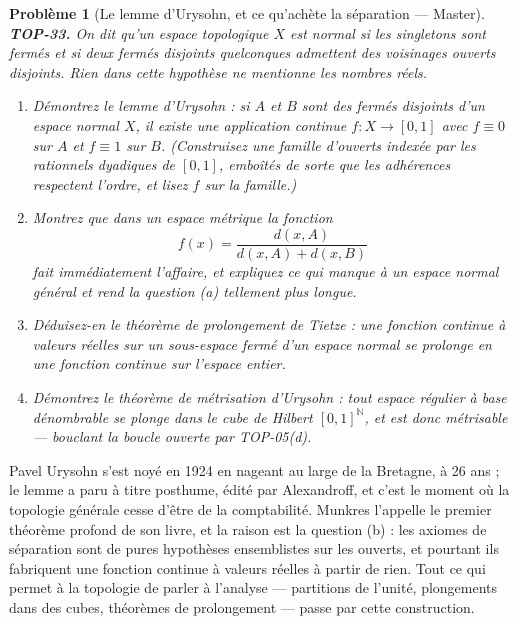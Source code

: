\documentclass[11pt]{article}
\newtheorem{problem}{Problème}
\begin{document}
\begin{problem}[{Le lemme d'Urysohn, et ce qu'achète la séparation --- Master}]
\textbf{TOP-33.} On dit qu'un espace topologique $ X $ est \textit{normal} si les singletons sont
fermés et si deux fermés disjoints quelconques admettent des voisinages ouverts disjoints. Rien dans
cette hypothèse ne mentionne les nombres réels.
\begin{enumerate}
\item[(a)] Démontrez le lemme d'Urysohn : si $ A $ et $ B $ sont des fermés disjoints d'un espace normal
$ X $, il existe une application continue $ f : X \to [0,1] $ avec $ f \equiv 0 $ sur $ A $ et
$ f \equiv 1 $ sur $ B $. (Construisez une famille d'ouverts indexée par les rationnels dyadiques de
$ [0,1] $, emboîtés de sorte que les adhérences respectent l'ordre, et lisez $ f $ sur la
famille.)
\item[(b)] Montrez que dans un espace métrique la fonction
\[ f(x) = \frac{d(x,A)}{d(x,A) + d(x,B)} \]
fait immédiatement l'affaire, et expliquez ce qui manque à un espace normal général et rend la question
(a) tellement plus longue.
\item[(c)] Déduisez-en le théorème de prolongement de Tietze : une fonction continue à valeurs réelles sur un
sous-espace fermé d'un espace normal se prolonge en une fonction continue sur l'espace entier.
\item[(d)] Démontrez le théorème de métrisation d'Urysohn : tout espace régulier à base dénombrable se plonge
dans le cube de Hilbert $ [0,1]^{\mathbb{N}} $, et est donc métrisable --- bouclant la boucle ouverte
par TOP-05(d).
\end{enumerate}

\end{problem}

\noindent Pavel Urysohn s'est noyé en 1924 en nageant au large de la Bretagne, à 26 ans ; le
lemme a paru à titre posthume, édité par Alexandroff, et c'est le moment où la topologie générale cesse
d'être de la comptabilité. Munkres l'appelle le premier théorème profond de son livre, et la raison est la
question (b) : les axiomes de séparation sont de pures hypothèses ensemblistes sur les ouverts, et pourtant
ils fabriquent une fonction continue à valeurs réelles à partir de rien. Tout ce qui permet à la topologie
de parler à l'analyse --- partitions de l'unité, plongements dans des cubes, théorèmes de prolongement ---
passe par cette construction.
\end{document}
